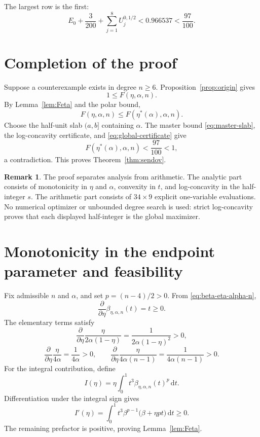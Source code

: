 \documentclass[11pt]{amsart}
\theoremstyle{definition}
\newtheorem{remark}[theorem]{Remark}
\newcommand{\dd}{\,\mathrm d}
\newcommand{\etaStar}{\eta^{\ast}}
\begin{document}
The largest row is the first:
\begin{equation}\label{eq:global-certificate}
 E_0+\frac3{200}+\sum_{j=1}^8U_j^{0,1/2}
 <0.966537<\frac{97}{100}.
\end{equation}

\section{Completion of the proof}\label{sec:completion}

Suppose a counterexample exists in degree $n\ge6$.  Proposition~\ref{prop:origin} gives
\[
 1\le F(\eta,\alpha,n).
\]
By Lemma~\ref{lem:Feta} and the polar bound,
\[
 F(\eta,\alpha,n)
 \le F(\etaStar(\alpha),\alpha,n).
\]
Choose the half-unit slab $(a,b]$ containing $\alpha$.  The master bound \eqref{eq:master-slab}, the log-concavity certificate, and \eqref{eq:global-certificate} give
\[
 F(\etaStar(\alpha),\alpha,n)<\frac{97}{100}<1,
\]
a contradiction.  This proves Theorem~\ref{thm:sendov}.

\begin{remark}
The proof separates analysis from arithmetic.  The analytic part consists of monotonicity in $\eta$ and $\alpha$, convexity in $t$, and log-concavity in the half-integer $s$.  The arithmetic part consists of $34\times9$ explicit one-variable evaluations.  No numerical optimizer or unbounded degree search is used: strict log-concavity proves that each displayed half-integer is the global maximizer.
\end{remark}

\appendix

\section{Monotonicity in the endpoint parameter and feasibility}\label{app:eta}

Fix admissible $n$ and $\alpha$, and set $p=(n-4)/2>0$.  From \eqref{eq:beta-eta-alpha-n},
\[
 \frac{\partial}{\partial\eta}\beta_{\eta,\alpha,n}(t)=t\ge0.
\]
The elementary terms satisfy
\[
 \frac{\partial}{\partial\eta}
 \frac{\eta}{2\alpha(1-\eta)}
 =\frac1{2\alpha(1-\eta)^2}>0,
\]
\[
 \frac{\partial}{\partial\eta}\frac\eta{4\alpha}
 =\frac1{4\alpha}>0,
 \qquad
 \frac{\partial}{\partial\eta}\frac\eta{4\alpha(n-1)}
 =\frac1{4\alpha(n-1)}>0.
\]
For the integral contribution, define
\[
 I(\eta)=\eta\int_0^1t^3\beta_{\eta,\alpha,n}(t)^p\dd t.
\]
Differentiation under the integral sign gives
\[
 I'(\eta)=
 \int_0^1t^3\beta^{p-1}
 \bigl(\beta+\eta pt\bigr)\dd t\ge0.
\]
The remaining prefactor is positive, proving Lemma~\ref{lem:Feta}.
\end{document}
